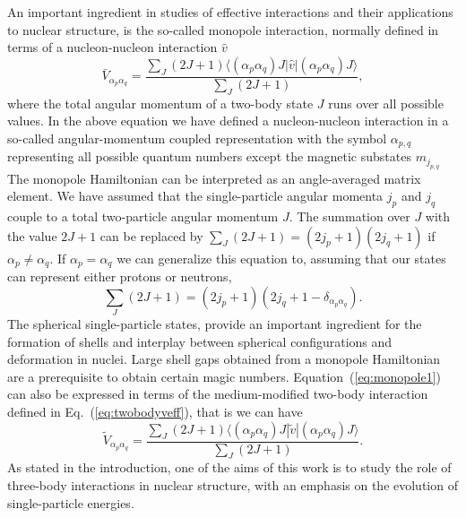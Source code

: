 \documentclass[aps,showpacs,floatfix,nofootinbib,preprintnumbers,superscriptaddress,amsmath,amssymb]{revtex4-1}
\begin{document}
An important ingredient in studies of effective interactions and their
applications to nuclear structure, is the so-called monopole
interaction, normally defined in terms of a nucleon-nucleon
interaction $\hat{v}$ \cite{otsuka2001,otsuka2005,otsuka2010b,smirnova2010,nowacki2012,smirnova2012,sorlin2008,poves1981a,poves1981b,zuker2003}
\begin{equation}
\bar{V}_{\alpha_p\alpha_q} = \frac{\sum_{J}(2J+1) \langle (\alpha_p\alpha_q)J | \hat{v} | (\alpha_p\alpha_q)J \rangle }{\sum_{J}(2J+1)},
\label{eq:monopole1}
\end{equation}
where the total angular momentum of a two-body state $J$ runs over all
possible values.  
In the above equation we have defined a nucleon-nucleon interaction in a so-called angular-momentum 
coupled representation with the symbol $\alpha_{p,q}$ representing all possible quantum numbers except the 
magnetic substates $m_{j_{p,q}}$
The monopole Hamiltonian can be interpreted as an angle-averaged matrix element.  
We have assumed that the single-particle angular momenta $j_p$ and $j_q$ couple to a total
two-particle angular momentum $J$.  The summation over $J$ with the value $2J+1$ can be replaced
by $\sum_J(2J+1)=(2j_p+1)(2j_q+1)$ if $\alpha_p\ne \alpha_q$. If $\alpha_p=\alpha_q$ we can generalize this equation to, assuming that 
our states can represent either protons or neutrons,
\begin{equation}
\sum_{J}(2J+1)=(2j_p+1)(2j_q+1-\delta_{\alpha_p\alpha_q}).
\label{eq:jvalue}
\end{equation}
The spherical single-particle states,
provide an important ingredient for the formation of shells and
interplay between spherical configurations and deformation in
nuclei. Large shell gaps obtained from a monopole Hamiltonian are a
prerequisite to obtain certain magic numbers. 
Equation~(\ref{eq:monopole1}) can also be expressed in terms of the
medium-modified two-body interaction defined in
Eq.~(\ref{eq:twobodyveff}), that is we can have 
\begin{equation}
\tilde{V}_{\alpha_p\alpha_q} = \frac{\sum_{J}(2J+1) \langle (\alpha_p\alpha_q)J | \tilde{v} | (\alpha_p\alpha_q)J \rangle }{\sum_{J}(2J+1)}.
\label{eq:monopole2}
\end{equation}
As stated in the introduction, one of the
aims of this work is to study the role of three-body interactions in
nuclear structure, with an emphasis on the evolution of
single-particle energies.
\end{document}
